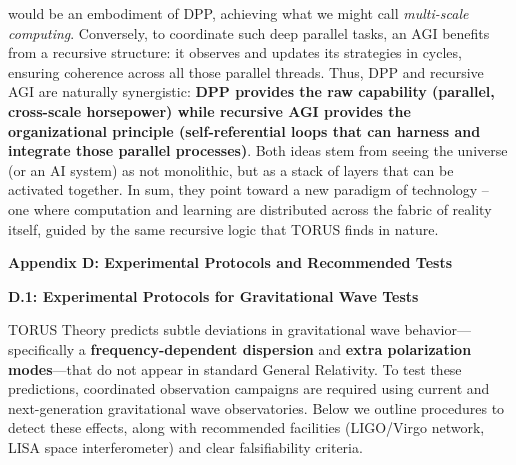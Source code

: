 \begin{itemize}
  would be an embodiment of DPP, achieving what we might call
  \emph{multi-scale computing}. Conversely, to coordinate such deep
  parallel tasks, an AGI benefits from a recursive structure: it
  observes and updates its strategies in cycles, ensuring coherence
  across all those parallel threads. Thus, DPP and recursive AGI are
  naturally synergistic: \textbf{DPP provides the raw capability
  (parallel, cross-scale horsepower) while recursive AGI provides the
  organizational principle (self-referential loops that can harness and
  integrate those parallel processes)}. Both ideas stem from seeing the
  universe (or an AI system) as not monolithic, but as a stack of layers
  that can be activated together. In sum, they point toward a new
  paradigm of technology -- one where computation and learning are
  distributed across the fabric of reality itself, guided by the same
  recursive logic that TORUS finds in nature.
\end{itemize}

\textbf{Appendix D: Experimental Protocols and Recommended Tests}

\textbf{D.1: Experimental Protocols for Gravitational Wave Tests}

TORUS Theory predicts subtle deviations in gravitational wave
behavior---specifically a \textbf{frequency-dependent dispersion} and
\textbf{extra polarization modes}---that do not appear in standard
General Relativity. To test these predictions, coordinated observation
campaigns are required using current and next-generation gravitational
wave observatories. Below we outline procedures to detect these effects,
along with recommended facilities (LIGO/Virgo network, LISA space
interferometer) and clear falsifiability criteria.

